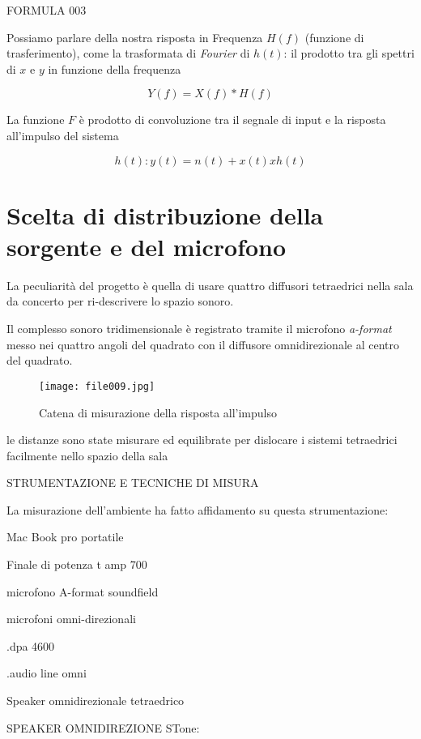 FORMULA 003


Possiamo parlare della nostra risposta in Frequenza $H(f)$ (funzione di trasferimento),
come la  trasformata di \emph{Fourier} di $h(t)$: il prodotto tra gli spettri di $x$ e $y$ in funzione della frequenza

\begin{equation}
Y(f)= X(f)*H(f) 
\end{equation}

La funzione $F$ è prodotto di convoluzione tra il segnale di input e la risposta all'impulso del sistema

\begin{equation}
h(t):y(t)= n(t) + x(t) x h(t)
\end{equation}


\section{Scelta di distribuzione della sorgente e del microfono}

La peculiarità del progetto è quella di usare  quattro diffusori tetraedrici nella sala da concerto per ri-descrivere lo spazio sonoro.

Il complesso sonoro tridimensionale è registrato tramite il microfono \emph{a-format} messo nei quattro angoli del quadrato con il diffusore omnidirezionale al centro del quadrato. 

\begin{figure}
\centering
{\texttt{[image: file009.jpg]}}
\caption[Pianta S. Luca]{Catena di misurazione della risposta all'impulso}
\label{fig:tetratetra}
\end{figure}

le distanze sono state misurare ed equilibrate per dislocare i sistemi tetraedrici facilmente nello spazio della sala

STRUMENTAZIONE E TECNICHE DI MISURA

La misurazione dell'ambiente ha fatto affidamento su questa strumentazione:

Mac Book pro portatile

Finale di potenza t amp 700

microfono A-format soundfield

microfoni omni-direzionali

.dpa 4600

.audio line omni

Speaker omnidirezionale tetraedrico

SPEAKER OMNIDIREZIONE STone:

